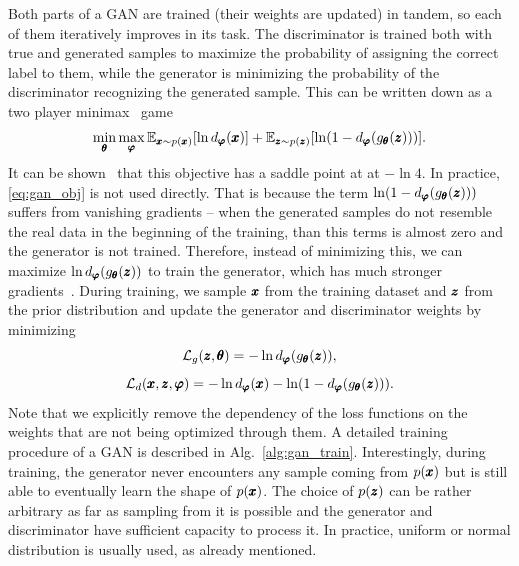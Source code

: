 Both parts of a GAN are trained (their weights are updated) in tandem, so each of them iteratively improves in its task. The discriminator is trained both with true and generated samples to maximize the probability of assigning the correct label to them, while the generator is minimizing the probability of the discriminator recognizing the generated sample. This can be written down as a two player minimax~\cite{maschler2020game} game 
\begin{equation} \label{eq:gan_obj}
\min_{\vc{\theta}}\max_{\vc{\varphi}}\mathbb{E}_{ \vc{x} \sim p(\vc{x})}\left[\ln d_{\vc{\varphi}}(\vc{x})\right]+\mathbb{E}_{\vc{z}\sim p(\vc{z})}\left[\ln\left(1-d_{\vc{\varphi}}(g_{\vc{\theta}}(\vc{z}))\right)\right].
\end{equation}
It can be shown~\cite{goodfellow2014gan} that this objective has a saddle point at at $-\ln4$. In practice, \eqref{eq:gan_obj} is not used directly. That is because the term $\ln\left(1-d_{\vc{\varphi}}(g_{\vc{\theta}}(\vc{z}))\right)$ suffers from vanishing gradients -- when the generated samples do not resemble the real data in the beginning of the training, than this terms is almost zero and the generator is not trained. Therefore, instead of minimizing this, we can maximize $\ln d_{\pmb{{\varphi}}}(g_{\pmb{{\theta}}}(\pmb{{z}}))$ to train the generator, which has much stronger gradients~\cite{goodfellow2014gan}. During training, we sample $\pmb{{x}}$ from the training dataset and $\pmb{{z}}$ from the prior distribution and update the generator and discriminator weights by minimizing
\begin{equation}\label{eq:gen_loss}
\mathcal{L}_{g}(\pmb{{z}},\pmb{{\theta}})= - \ln d_{\pmb{{\varphi}}}(g_{\pmb{{\theta}}}(\pmb{{z}})),
\end{equation}
\begin{equation}\label{eq:disc_loss}
\mathcal{L}_{d}(\vc{x},\vc{z},\vc{\varphi})= - \ln d_{\vc{\varphi}}(\vc{x}) - \ln\left(1-d_{\vc{\varphi}}(g_{\vc{\theta}}(\vc{z}))\right).
\end{equation}
Note that we explicitly remove the dependency of the loss functions on the weights that are not being optimized through them. A detailed training procedure of a GAN is described in Alg.~\ref{alg:gan_train}. Interestingly, during training, the generator never encounters any sample coming from $p(\pmb{{x}})$ but is still able to eventually learn the shape of $p(\pmb{{x}})$. The choice of $p(\pmb{{z}})$ can be rather arbitrary as far as sampling from it is possible and the generator and discriminator have sufficient capacity to process it. In practice, uniform or normal distribution is usually used, as already mentioned. 

